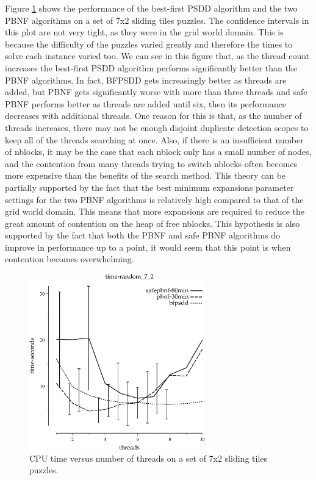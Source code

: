 \documentclass{article}
\begin{document}
Figure \ref{fig:tiles-7x2} shows the performance of the best-first
PSDD algorithm and the two PBNF algorithms on a set of 7x2 sliding
tiles puzzles.  The confidence intervals in this plot are not very
tight, as they were in the grid world domain.  This is because the
difficulty of the puzzles varied greatly and therefore the times to
solve each instance varied too.  We can see in this figure that, as
the thread count increases the best-first PSDD algorithm performs
significantly better than the PBNF algorithms.  In fact, BFPSDD gets
increasingly better as threads are added, but PBNF gets significantly
worse with more than three threads and safe PBNF performs better as
threads are added until six, then its performance decreases with
additional threads.  One reason for this is that, as the number of
threads increases, there may not be enough disjoint duplicate
detection scopes to keep all of the threads searching at once.  Also,
if there is an insufficient number of nblocks, it may be the case that
each nblock only has a small number of nodes, and the contention from
many threads trying to switch nblocks often becomes more expensive
than the benefits of the search method.  This theory can be partially
supported by the fact that the best minimum expansions parameter
settings for the two PBNF algorithms is relatively high compared to
that of the grid world domain.  This means that more expansions are
required to reduce the great amount of contention on the heap of free
nblocks.  This hypothesis is also supported by the fact that both the
PBNF and safe PBNF algorithms do improve in performance up to a point,
it would seem that this point is when contention becomes overwhelming.

\begin{figure}[t]
\begin{center}
\includegraphics[width=3in]{../graphs/tiles_random_7_2/time-random_7_2.eps}
\caption{CPU time versus number of threads on a set of 7x2 sliding
  tiles puzzles.}
\label{fig:tiles-7x2}
\end{center}
\end{figure}
\end{document}
